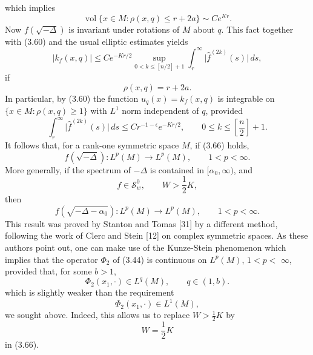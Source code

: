 which implies
\begin{equation}\tag{3.61}
\operatorname{vol}\{x \in M : \rho(x,q) \leq r + 2a\} \sim Ce^{Kr}.
\end{equation}
Now $f(\sqrt{-\Delta})$ is invariant under rotations of $M$ about $q$. This fact together with (3.60) and the usual elliptic estimates yields
\begin{equation}\tag{3.62}
\lvert k_f(x,q)\rvert \leq Ce^{-Kr/2} \sup_{0<k\leq [n/2] + 1}
\int_r^\infty \lvert \hat{f}^{(2k)}(s)\rvert\, ds,
\end{equation}
if
\begin{equation}\tag{3.63}
\rho(x,q)=r+2a.
\end{equation}
In particular, by (3.60) the function $u_q(x)=k_f(x,q)$ is integrable on $\{x \in M :
\rho(x,q)\geq 1\}$ with $L^1$ norm independent of $q$, provided
\begin{equation}\tag{3.64}
\int_r^\infty \lvert \hat{f}^{(2k)}(s)\rvert\, ds \leq Cr^{-1-\epsilon}e^{-Kr/2},\qquad
0\leq k\leq \left[\frac{n}{2}\right]+1.
\end{equation}
It follows that, for a rank-one symmetric space $M$, if (3.66) holds,
\begin{equation}\tag{3.65}
f(\sqrt{-\Delta}) : L^p(M)\to L^p(M),\qquad 1<p<\infty.
\end{equation}
More generally, if the spectrum of $-\Delta$ is contained in $[\alpha_0,\infty)$, and
\begin{equation}\tag{3.66}
f\in \mathcal{S}_w^0,\qquad W>\frac{1}{2}K,
\end{equation}
then
\begin{equation}\tag{3.67}
f\!\left(\sqrt{-\Delta-\alpha_0}\right): L^p(M)\to L^p(M),\qquad 1<p<\infty.
\end{equation}
This result was proved by Stanton and Tomas [31] by a different method, following the work of Clerc and Stein [12] on complex symmetric spaces. As these authors point out, one can make use of the Kunze-Stein phenomenon which implies that the operator $\Phi_2$ of (3.44) is continuous on $L^p(M)$, $1<p<$
$\infty$, provided that, for some $b>1$,
\begin{equation}\tag{3.68}
\Phi_2(x_1,\cdot)\in L^q(M),\qquad q\in(1,b).
\end{equation}
which is slightly weaker than the requirement
\begin{equation}\tag{3.69}
\Phi_2(x_1,\cdot)\in L^1(M),
\end{equation}
we sought above. Indeed, this allows us to replace $W>\frac{1}{2}K$ by
\begin{equation}\tag{3.70}
W=\frac{1}{2}K
\end{equation}
in (3.66).
